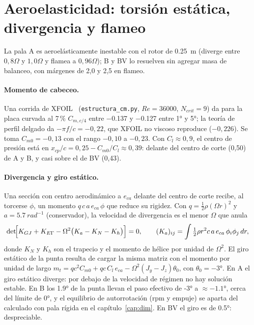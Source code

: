 \section{Aeroelasticidad: torsión estática, divergencia y flameo}\label{sec:estructura-aeroel}

La pala A es aeroelásticamente inestable con el rotor de \SI{0.25}{m} (diverge entre
$0{,}8\Omega$ y $1{,}0\Omega$ y flamea a $0{,}96\Omega$); B y BV lo resuelven sin agregar masa
de balanceo, con márgenes de 2,0 y 2,5 en flameo.

\paragraph{Momento de cabeceo.} Una corrida de XFOIL~\cite{estructura-drela1989}
(\texttt{estructura\_cm.py}, $Re=\num{36000}$, $N_{crit}=9$) da para la placa curvada al
7\,\% $C_{m,c/4}$ entre \num{-0.137} y \num{-0.127} entre \ang{1} y \ang{5}; la teoría de perfil
delgado da $-\pi f/c=-0{,}22$, que XFOIL no viscoso reproduce ($-0{,}226$). Se toma
$C_{m0}=-0{,}13$ con el rango $-0{,}10$ a $-0{,}23$. Con $C_l\approx0{,}9$, el centro de
presión está en $x_{cp}/c=0{,}25-C_{m0}/C_l\approx0{,}39$: delante del centro de corte
(0,50) de A y B, y casi sobre el de BV (0,43).

\paragraph{Divergencia y giro estático.} Una sección con centro aerodinámico a $e_{ca}$
delante del centro de corte recibe, al torcerse $\phi$, un momento
$q\,c\,a\,e_{ca}\,\phi$ que reduce su rigidez. Con $q=\frac12\rho(\Omega r)^2$ y
$a=\SI{5.7}{rad^{-1}}$ (conservador), la velocidad de divergencia es el menor $\Omega$ que
anula
\begin{equation}
  \det\!\Bigl[K_{GJ}+K_{E\Gamma}-\Omega^2\bigl(K_a-K_N-K_h\bigr)\Bigr]=0,\qquad
  (K_a)_{ij}=\int \tfrac12\rho r^2 c\,a\,e_{ca}\,\phi_i\phi_j\,dr ,
  \label{eq:estructura-div}
\end{equation}
donde $K_N$ y $K_h$ son el trapecio y el momento de hélice por unidad de $\Omega^2$. El
giro estático de la punta resulta de cargar la misma matriz con el momento por unidad de
largo $m_t=q c^2 C_{m0}+q c\,C_l\,e_{ca}-\Omega^2(J_y-J_z)\theta_0$, con
$\theta_0=\ang{-3}$. En A el giro estático diverge: por debajo de la velocidad de régimen no hay
solución estable. En B los \ang{+1.9} de la punta llevan el paso efectivo de \ang{-3} a
$\approx\ang{-1.1}$, cerca del límite de \ang{0}, y el equilibrio de autorrotación (rpm y
empuje) se aparta del calculado con pala rígida en el capítulo~\ref{cap:dim}. En BV el
giro es de \ang{+0.5}: despreciable.

